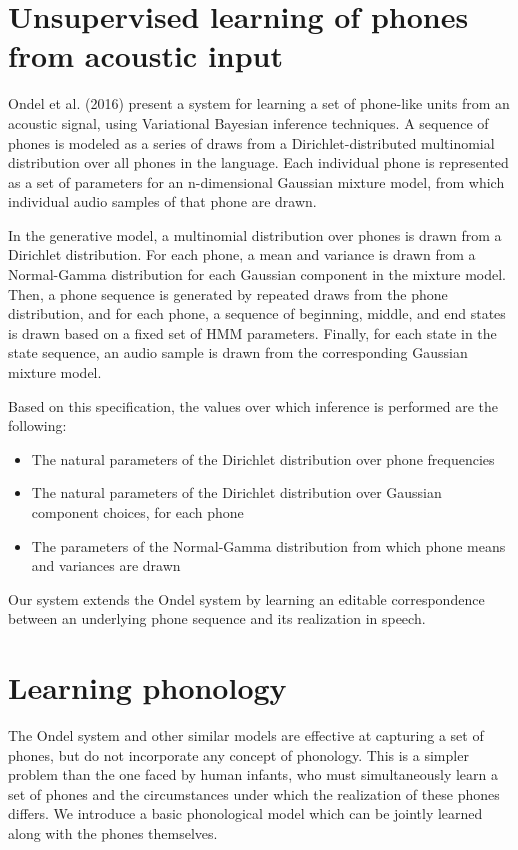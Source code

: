 \documentclass[11pt]{article}
\begin{document}
\section{Unsupervised learning of phones from acoustic input}

Ondel et al. (2016) present a system for learning a set of phone-like units from an acoustic signal, using Variational Bayesian inference techniques. A sequence of phones is modeled as a series of draws from a Dirichlet-distributed multinomial distribution over all phones in the language. Each individual phone is represented as a set of parameters for an n-dimensional Gaussian mixture model, from which individual audio samples of that phone are drawn. 

In the generative model, a multinomial distribution over phones is drawn from a Dirichlet distribution. For each phone, a mean and variance is drawn from a Normal-Gamma distribution for each Gaussian component in the mixture model. Then, a phone sequence is generated by repeated draws from the phone distribution, and for each phone, a sequence of beginning, middle, and end states is drawn based on a fixed set of HMM parameters. Finally, for each state in the state sequence, an audio sample is drawn from the corresponding Gaussian mixture model. 

Based on this specification, the values over which inference is performed are the following:
\begin{itemize}
\item The natural parameters of the Dirichlet distribution over phone frequencies
\item The natural parameters of the Dirichlet distribution over Gaussian component choices, for each phone
\item The parameters of the Normal-Gamma distribution from which phone means and variances are drawn

\end{itemize}

Our system extends the Ondel system by learning an editable correspondence between an underlying phone sequence and its realization in speech.


\section{Learning phonology}

The Ondel system and other similar models are effective at capturing a set of phones, but do not incorporate any concept of phonology. This is a simpler problem than the one faced by human infants, who must simultaneously learn a set of phones and the circumstances under which the realization of these phones differs. We introduce a basic phonological model which can be jointly learned along with the phones themselves.
\end{document}
